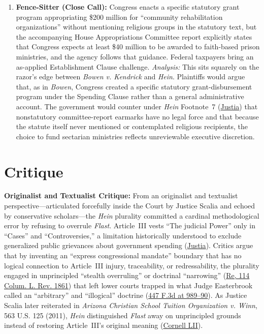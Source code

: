 \documentclass[12pt]{article}
\begin{document}
\begin{enumerate}
    \item \textbf{Fence-Sitter (Close Call):} Congress enacts a specific statutory grant program appropriating \$200 million for ``community rehabilitation organizations'' without mentioning religious groups in the statutory text, but the accompanying House Appropriations Committee report explicitly states that Congress expects at least \$40 million to be awarded to faith-based prison ministries, and the agency follows that guidance. Federal taxpayers bring an as-applied Establishment Clause challenge. \textit{Analysis:} This sits squarely on the razor's edge between \textit{Bowen v. Kendrick} and \textit{Hein}. Plaintiffs would argue that, as in \textit{Bowen}, Congress created a specific statutory grant-disbursement program under the Spending Clause rather than a general administrative account. The government would counter under \textit{Hein} Footnote~7 (\href{https://supreme.justia.com/cases/federal/us/551/587/}{Justia}) that nonstatutory committee-report earmarks have no legal force and that because the statute itself never mentioned or contemplated religious recipients, the choice to fund sectarian ministries reflects unreviewable executive discretion.
\end{enumerate}

\section{Critique}

\textbf{Originalist and Textualist Critique:} From an originalist and textualist perspective---articulated forcefully inside the Court by Justice Scalia and echoed by conservative scholars---the \textit{Hein} plurality committed a cardinal methodological error by refusing to overrule \textit{Flast}. Article~III vests ``The judicial Power'' only in ``Cases'' and ``Controversies,'' a limitation historically understood to exclude generalized public grievances about government spending (\href{https://supreme.justia.com/cases/federal/us/551/587/}{Justia}). Critics argue that by inventing an ``express congressional mandate'' boundary that has no logical connection to Article~III injury, traceability, or redressability, the plurality engaged in unprincipled ``stealth overruling'' or doctrinal ``narrowing'' (\href{https://columbialawreview.org/wp-content/uploads/2016/04/Re.pdf}{Re, 114 Colum. L. Rev. 1861}) that left lower courts trapped in what Judge Easterbrook called an ``arbitrary'' and ``illogical'' doctrine (\href{https://law.justia.com/cases/federal/appellate-courts/F3/447/988/505254/}{447 F.3d at 989--90}). As Justice Scalia later reiterated in \textit{Arizona Christian School Tuition Organization v. Winn}, 563 U.S. 125 (2011), \textit{Hein} distinguished \textit{Flast} away on unprincipled grounds instead of restoring Article~III's original meaning (\href{https://www.law.cornell.edu/supct/pdf/09-987P.ZC}{Cornell LII}).
\end{document}
